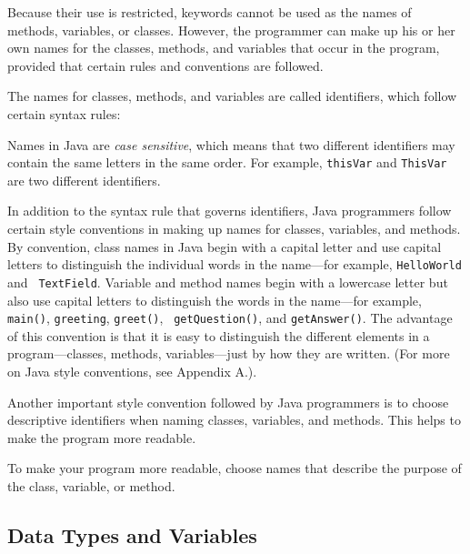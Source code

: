 Because their use is restricted, keywords cannot be used as the names
of methods, variables, or classes.  However, the programmer can make
up his or her own names for the classes, methods, and variables that
occur in the program, provided that certain rules and conventions are
followed.

The names for classes, methods, and variables are called identifiers,
which follow certain syntax rules:


\noindent Names in Java are {\it case sensitive}, which means that
two different identifiers may contain the same letters in the same
order. For example, {\tt thisVar} and {\tt ThisVar} are two different
identifiers.

In addition to the syntax rule that governs identifiers, Java
programmers follow certain style conventions in making up names for
classes, variables, and methods. By convention, class names in Java
begin with a capital letter and use capital letters to distinguish the
individual words in the name---for example, {\tt HelloWorld} and {\tt
{}
TextField}.  Variable and method names begin with a lowercase letter
but also use capital letters to distinguish the words in the
name---for example, {\tt main()}, {\tt greeting}, {\tt greet()}, {\tt
getQuestion()}, and {\tt getAnswer()}.  The advantage of this convention
is that it is easy to distinguish the different elements in a
program---classes, methods, variables---just by how they are
written. (For more on Java style conventions, see
Appendix A.).

Another important style convention followed by Java programmers
is to choose descriptive identifiers when naming classes,
variables, and methods. This helps to make the program more
readable.

%
{To make your program more readable, choose names that describe the
purpose of the class, variable, or method.}

\subsection{Data Types and Variables}
\label{subsec:primitives}


